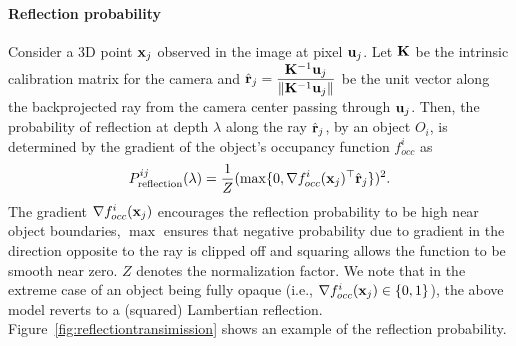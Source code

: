 \vspace{-0.3cm}
\paragraph{Reflection probability}
Consider a 3D point $\mathbf{x}_j$ observed in the image at pixel $\mathbf{u}_j$. Let $\mathbf{K}$ be the intrinsic calibration matrix for the camera and $\hat{\mathbf{r}}_j = \displaystyle\frac{\mathbf{K}^{-1}\mathbf{u}_j}{\lVert \mathbf{K}^{-1}\mathbf{u}_j \rVert}$ be the unit vector along the backprojected ray from the camera center passing through $\mathbf{u}_j$. Then, the probability of reflection at depth $\lambda$ along the ray $\hat{\mathbf{r}}_j$, by an object $O_i$, is determined by the gradient of the object's occupancy function $f_{occ}^i$ as
\begin{align}
   P^{ij}_{\text{reflection}}(\lambda) = \frac{1}{Z}(\max \{0, \nabla {f^i_{occ}}(\mathbf{x}_j)^\top \hat{\mathbf{r}}_j \})^2.
\label{eq:evalPrefl}
\end{align}
The gradient $\nabla {f^i_{occ}}(\mathbf{x}_j)$ encourages the reflection probability to be high near object boundaries, $\max$ ensures that negative probability due to gradient in the direction opposite to the ray is clipped off and squaring allows the function to be smooth near zero. $Z$ denotes the normalization factor. We note that in the extreme case of an object being fully opaque (i.e., $\nabla {f^i_{occ}(\mathbf{x}_j)} \in \{0,1\}$), the above model reverts to a (squared) Lambertian reflection. Figure~\ref{fig:reflectiontransimission} shows an example of the reflection probability.

\vspace{-0.3cm}
